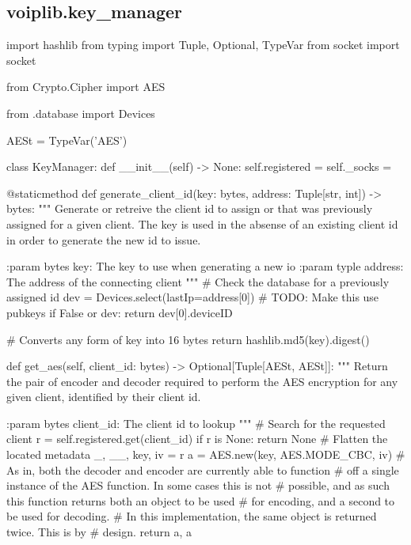 \subsection{voiplib.key\_manager}
\begin{pythoncode}
import hashlib
from typing import Tuple, Optional, TypeVar
from socket import socket

from Crypto.Cipher import AES

from .database import Devices


AESt = TypeVar('AES')


class KeyManager:
    def __init__(self) -> None:
        self.registered = {}
        self._socks = {}

    @staticmethod
    def generate_client_id(key: bytes, address: Tuple[str, int]) -> bytes:
        """
        Generate or retreive the client id to assign or that was previously
        assigned for a given client. The key is used in the absense of an
        existing client id in order to generate the new id to issue.

        :param bytes key: The key to use when generating a new io
        :param typle address: The address of the connecting client
        """
        # Check the database for a previously assigned id
        dev = Devices.select(lastIp=address[0])
        # TODO: Make this use pubkeys
        if False or dev:
            return dev[0].deviceID
        
        # Converts any form of key into 16 bytes
        return hashlib.md5(key).digest()

    def get_aes(self, client_id: bytes) -> Optional[Tuple[AESt, AESt]]:
        """
        Return the pair of encoder and decoder required to perform the AES
        encryption for any given client, identified by their client id.

        :param bytes client_id: The client id to lookup
        """
        # Search for the requested client
        r = self.registered.get(client_id)
        if r is None:
            return None
        # Flatten the located metadata
        _, __, key, iv = r
        a = AES.new(key, AES.MODE_CBC, iv)
        # As in, both the decoder and encoder are currently able to function
        # off a single instance of the AES function. In some cases this is not
        # possible, and as such this function returns both an object to be used
        # for encoding, and a second to be used for decoding.
        # In this implementation, the same object is returned twice. This is by
        # design.
        return a, a


\end{pythoncode}

